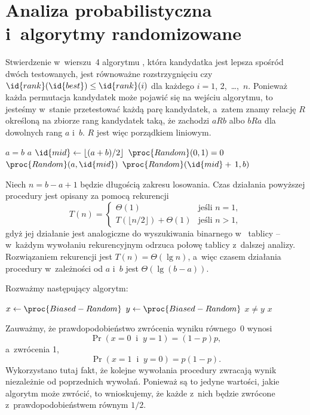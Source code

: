 \chapter{Analiza probabilistyczna i~algorytmy randomizowane}


\exercise %
Stwierdzenie w~wierszu~4 algorytmu , która kandydatka jest lepsza spośród dwóch testowanych, jest równoważne rozstrzygnięciu czy $\id{rank}(\id{best})\le\id{rank}(i)$ dla każdego $i=1$, 2,~\dots,~$n$. Ponieważ każda permutacja kandydatek może pojawić się na wejściu algorytmu, to jesteśmy w~stanie przetestować każdą parę kandydatek, a~zatem znamy relację $R$ określoną na zbiorze rang kandydatek taką, że zachodzi $aRb$ albo $bRa$ dla dowolnych rang $a$ i~$b$. $R$ jest więc porządkiem liniowym.

\exercise %
\begin{codebox}
\li	\If $a=b$
\li		\Then
			\Return $a$
		\End
\li	$\id{mid}\gets\lfloor(a+b)/2\rfloor$
\li	\If $\proc{Random}(0,1)=0$
\li		\Then
			\Return $\proc{Random}(a,\id{mid})$
\li		\Else
			\Return $\proc{Random}(\id{mid}+\,1,b)$
		\End
\end{codebox}
Niech $n=b-a+1$ będzie długością zakresu losowania. Czas działania powyższej procedury jest opisany za pomocą rekurencji
\[
	T(n) =
	\begin{cases}
		\Theta(1) & \text{jeśli $n=1$}, \\
		T(\lfloor n/2\rfloor)+\Theta(1) & \text{jeśli $n>1$},
	\end{cases}
\]
gdyż jej działanie jest analogiczne do wyszukiwania binarnego w~ tablicy -- w~każdym wywołaniu rekurencyjnym odrzuca połowę tablicy z~dalszej analizy. Rozwiązaniem rekurencji jest $T(n)=\Theta(\lg n)$, a~więc czasem działania procedury  w~zależności od $a$ i~$b$ jest $\Theta(\lg(b-a))$.

\exercise %
Rozważmy następujący algorytm:
\begin{codebox}
\li	\Repeat
		$x\gets\proc{Biased-Random}$
\li		$y\gets\proc{Biased-Random}$
\li	\Until $x\ne y$ \label{li:unbiased-repeat-end}
\li \Return $x$
\end{codebox}
Zauważmy, że prawdopodobieństwo zwrócenia wyniku równego~0 wynosi
\[
	\Pr(x=0\;\;\text{i}\;\;y=1) = (1-p)p,
\]
a~zwrócenia 1,
\[
	\Pr(x=1\;\;\text{i}\;\;y=0) = p(1-p).
\]
Wykorzystano tutaj fakt, że kolejne wywołania procedury  zwracają wynik niezależnie od poprzednich wywołań. Ponieważ są to jedyne wartości, jakie algorytm może zwrócić, to wnioskujemy, że każde z~nich będzie zwrócone z~prawdopodobieństwem równym $1/2$.

